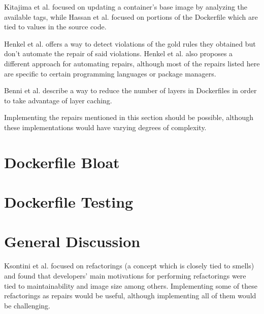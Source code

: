 Kitajima et al. \cite{kitajimaLatestImageRecommendation2020} focused on updating a container's base image by analyzing the available tags, while Hassan et al. \cite{hassanRUDSEARecommendingUpdates2018} focused on portions of the Dockerfile which are tied to values in the source code.

Henkel et al. \cite{henkelLearningUnderstandingSupporting2020} offers a way to detect violations of the gold rules they obtained but don't automate the repair of said violations. Henkel et al. \cite{henkelShipwrightHumanintheLoopSystem2021} also proposes a different approach for automating repairs, although most of the repairs listed here are specific to certain programming languages or package managers.

Benni et al. \cite{benniSupportingMicroservicesDeployment2018} describe a way to reduce the number of layers in Dockerfiles in order to take advantage of layer caching.

Implementing the repairs mentioned in this section should be possible, although these implementations would have varying degrees of complexity.

\section{Dockerfile Bloat} \label{sec:dockerfile_bloat}
\section{Dockerfile Testing} \label{sec:dockerfile_testing}
\section{General Discussion} \label{sec:general_discussion}

Ksontini et al. \cite{ksontiniRefactoringsTechnicalDebt} focused on refactorings (a concept which is closely tied to smells) and found that developers' main motivations for performing refactorings were tied to maintainability and image size among others. Implementing some of these refactorings as repairs would be useful, although implementing all of them would be challenging.

